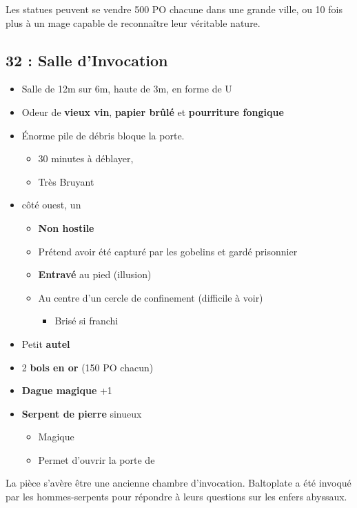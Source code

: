 Les statues peuvent se vendre 500 PO chacune dans une grande ville, ou 10 fois plus à un mage capable de reconnaître leur véritable nature.

\subsection{32 : Salle d’Invocation}\label{n3:s32}
\begin{itemize}
  \item Salle de 12m sur 6m, haute de 3m, en forme de U
  \item Odeur de \textbf{vieux vin}, \textbf{papier brûlé} et \textbf{pourriture fongique}
  \item \'Enorme pile de débris bloque la porte.
  \begin{itemize}
    \item 30 minutes à déblayer, 
    \item Très Bruyant
  \end{itemize}
  \item côté ouest, un \textbf{}
  \begin{itemize}
    \item \textbf{Non hostile}
    \item Prétend avoir été capturé par les gobelins et gardé prisonnier
    \item \textbf{Entravé} au pied (illusion)
    \item Au centre d'un cercle de confinement (difficile à voir)
    \begin{itemize}
      \item Brisé si franchi
    \end{itemize}
  \end{itemize}
  \item Petit \textbf{autel}
  \item 2 \textbf{bols en or} (150 PO chacun)
  \item \textbf{Dague magique} +1
  \item \textbf{Serpent de pierre} sinueux
  \begin{itemize}
    \item Magique
    \item Permet d'ouvrir la porte de 
  \end{itemize}
\end{itemize}

La pièce s’avère être une ancienne chambre d’invocation.
Baltoplate a été invoqué par les hommes-serpents pour répondre à leurs questions sur les enfers abyssaux.



